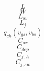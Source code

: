 \documentclass[letterpaper 12pt]{book}
\begin{document}
\[ L \]
\[W \]
\[ L_{ov} \]
\[ L_j \]
\[ q_{ch}(v_{gs},v_{bs}) \]
\[ C_{ox} \]
\[ C_{dep} \]
\[ C_{j,A} \]
\[ C_{j,sw} \]
\end{document}
